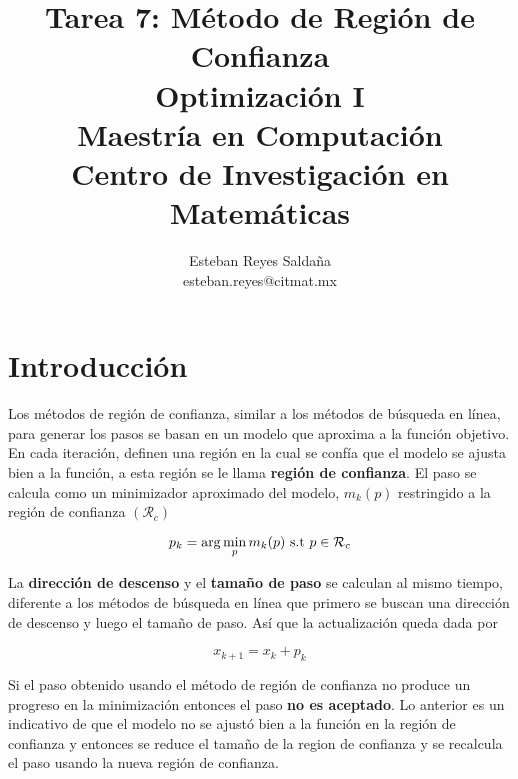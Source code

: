 \documentclass[11pt,letterpaper]{article}
\title{\textbf{Tarea 7: Método de Región de Confianza}\\ Optimización I \\ \Large {Maestría en Computación}\\ \Large {Centro de Investigación en Matemáticas}}
\author{Esteban Reyes Saldaña \\ esteban.reyes@citmat.mx}
\theoremstyle{definition}
\theoremstyle{definition}
\theoremstyle{definition}
\begin{document}

\section{Introducción}
Los métodos de región de confianza, similar a los métodos de búsqueda en línea, para generar los pasos se basan en un modelo que aproxima a la función objetivo. En cada iteración, definen una región en la cual se confía que el modelo se ajusta bien a la función, a esta región se le llama \textbf{región de confianza}. El paso se calcula como un minimizador aproximado del modelo, $ m_k (p) $ restringido a la región de confianza $ (\mathcal{R}_c) $
\begin{shaded*}
\[ p_k = \arg\min_p m_k (p) \textup{ s.t } p \in \mathcal{R}_c \]
\end{shaded*}
La \textbf{dirección de descenso} y el \textbf{tamaño de paso} se calculan al mismo tiempo, diferente a los métodos de búsqueda en línea que primero se buscan una dirección de descenso y luego el tamaño de paso. Así que la actualización queda dada por
\begin{shaded*}
\[ x_{k+1} = x_k + p_k \]
\end{shaded*}
Si el paso obtenido usando el método de región de confianza no produce un progreso en la minimización entonces el paso \textbf{no es aceptado}. Lo anterior es un indicativo de que el modelo no se ajustó bien a la función en la región de confianza y entonces se reduce el tamaño de la region de confianza y se recalcula
el paso usando la nueva región de confianza.
\end{document}
